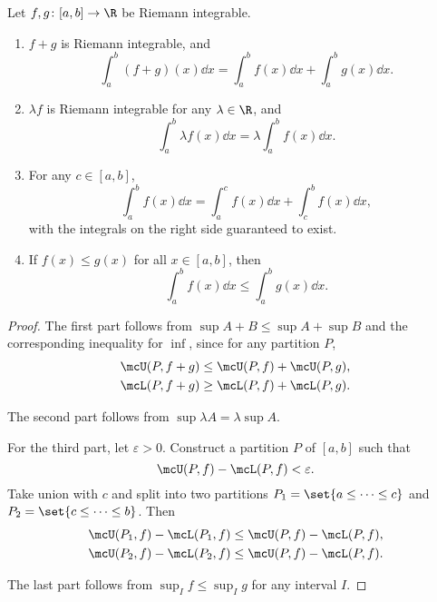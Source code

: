\begin{exercise} \label{thm:riemann:prop}
    Let $f, g\colon [a, b] \to \R$ be Riemann integrable.
    \begin{enumerate}[label=(\alph*)]
        \item $f + g$ is Riemann integrable, and \[
            \int_a^b (f + g)(x) \dd x = \int_a^b f(x) \dd x
                + \int_a^b g(x) \dd x.
        \] \label{thm:riemann:prop:sum}
        \item $\lambda f$ is Riemann integrable for any $\lambda \in \R$,
        and \[
            \int_a^b \lambda f(x) \dd x = \lambda \int_a^b f(x) \dd x.
        \] \label{thm:riemann:prop:scale}
        \item For any $c \in [a, b]$, \[
            \int_a^b f(x) \dd x = \int_a^c f(x) \dd x
                + \int_c^b f(x) \dd x,
        \] with the integrals on the right side guaranteed to exist.
        \label{thm:riemann:prop:split}
        \item If $f(x) \le g(x)$ for all $x \in [a, b]$, then \[
            \int_a^b f(x) \dd x \le \int_a^b g(x) \dd x.
        \] \label{thm:riemann:prop:squeeze}
    \end{enumerate}
\end{exercise}
\begin{proof}
    The first part follows from $\sup A + B \le \sup A + \sup B$ and the
    corresponding inequality for $\inf$, since for any partition $P$,
    \begin{align*}
        \mcU(P, f + g) &\le \mcU(P, f) + \mcU(P, g), \\
        \mcL(P, f + g) &\ge \mcL(P, f) + \mcL(P, g).
    \end{align*}

    The second part follows from $\sup \lambda A = \lambda \sup A$.

    For the third part, let $\varepsilon > 0$.
    Construct a partition $P$ of $[a, b]$ such that \[
        \mcU(P, f) - \mcL(P, f) < \varepsilon.
    \] Take union with $c$ and split into two partitions
    $P_1 = \set{a \le \dots \le c}$ and $P_2 = \set{c \le \dots \le b}$.
    Then \begin{align*}
        \mcU(P_1, f) - \mcL(P_1, f) &\le \mcU(P, f) - \mcL(P, f), \\
        \mcU(P_2, f) - \mcL(P_2, f) &\le \mcU(P, f) - \mcL(P, f). \qedhere
    \end{align*}

    The last part follows from $\sup_I f \le \sup_I g$ for any interval $I$.
\end{proof}

